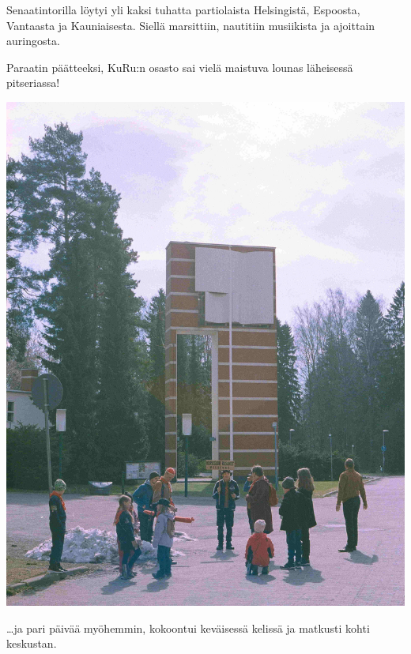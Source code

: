 \documentclass[10pt,finnish,a5paper,twoside=semi]{scrartcl}
\begin{document}
\begin{multicols}{2}
	\vspace*{-0.32cm}
	\small Senaatintorilla löytyi yli kaksi tuhatta partiolaista Helsingistä, Espoosta, Vantaasta ja Kauniaisesta. Siellä marsittiin, nautitiin musiikista ja ajoittain auringosta.

	Paraatin päätteeksi, KuRu:n osasto sai vielä maistuva lounas läheisessä \mbox{pitseriassa}!

	\columnbreak

	\begin{center}
		\noindent\includegraphics[width=0.9\linewidth]{assets/paraati2}
	\end{center}

	\vspace*{-0.32cm}
	\ldots ja pari päivää myöhemmin, kokoontui keväisessä kelissä ja matkusti kohti keskustan.


\end{multicols}
\end{document}
